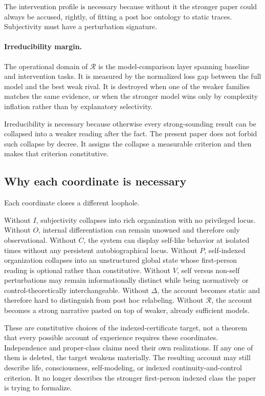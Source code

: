 \documentclass[11pt,a4paper]{article}
\theoremstyle{definition}
\newcommand{\SelfIndex}{I}
\newcommand{\OwnField}{O}
\newcommand{\ContField}{C}
\newcommand{\Persp}{P}
\newcommand{\ValAsym}{V}
\newcommand{\IntervProf}{\Delta}
\newcommand{\Irred}{\mathcal{R}}
\begin{document}
The intervention profile is necessary because without it the stronger paper could always be accused, rightly, of fitting a post hoc ontology to static traces. Subjectivity must have a perturbation signature.

\paragraph{Irreducibility margin.}
The operational domain of $\Irred$ is the model-comparison layer spanning baseline and intervention tasks. It is measured by the normalized loss gap between the full model and the best weak rival. It is destroyed when one of the weaker families matches the same evidence, or when the stronger model wins only by complexity inflation rather than by explanatory selectivity.

Irreducibility is necessary because otherwise every strong-sounding result can be collapsed into a weaker reading after the fact. The present paper does not forbid such collapse by decree. It assigns the collapse a measurable criterion and then makes that criterion constitutive.

\subsection{Why each coordinate is necessary}
Each coordinate closes a different loophole.

Without $\SelfIndex$, subjectivity collapses into rich organization with no privileged locus. Without $\OwnField$, internal differentiation can remain unowned and therefore only observational. Without $\ContField$, the system can display self-like behavior at isolated times without any persistent auto\-bio\-graphical locus. Without $\Persp$, self-indexed organization collapses into an unstructured global state whose first-person reading is optional rather than constitutive. Without $\ValAsym$, self versus non-self perturbations may remain informationally distinct while being normatively or control-theoretically interchangeable. Without $\IntervProf$, the account becomes static and therefore hard to distinguish from post hoc relabeling. Without $\Irred$, the account becomes a strong narrative pasted on top of weaker, already sufficient models.

These are constitutive choices of the indexed-certificate target, not a theorem that every possible account of experience requires these coordinates. Independence and proper-class claims need their own realizations. If any one of them is deleted, the target weakens materially. The resulting account may still describe life, consciousness, self-modeling, or indexed continuity-and-control criterion. It no longer describes the stronger first-person indexed class the paper is trying to formalize.
\end{document}
